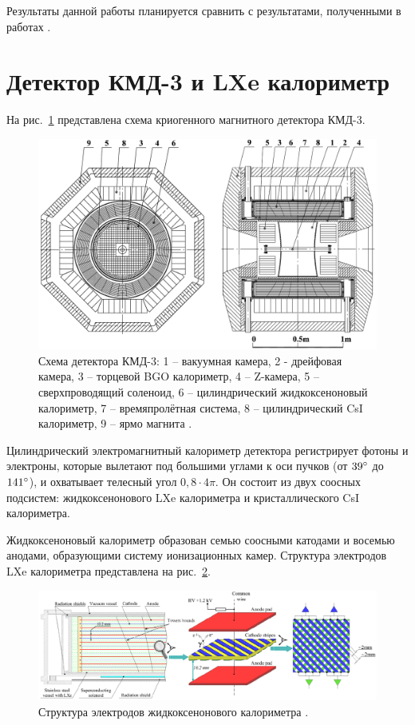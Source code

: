 \documentclass[14pt]{extarticle}
\begin{document}
Результаты данной работы планируется сравнить с результатами, полученными в работах \cite{lakomov,rabusov}.
\section{Детектор КМД-3 и LXe калориметр}
На рис.~\ref{fig:cmd3} представлена схема криогенного магнитного детектора КМД-3.
\begin{figure}[h!]
	\includegraphics[width=\linewidth]{../pics/cmd3-2.png}
	\caption{Схема детектора КМД-3: 1 -- вакуумная камера, 2 - дрейфовая камера, 3 -- торцевой BGO калориметр, 4 -- Z-камера, 5 -- сверхпроводящий соленоид, 6 -- цилиндрический жидкоксеноновый калориметр, 7 -- времяпролётная система, 8 -- цилиндрический CsI калориметр, 9 -- ярмо магнита \cite{shebalin}.}
	\label{fig:cmd3}
\end{figure}

Цилиндрический электромагнитный калориметр детектора регистрирует фотоны и электроны, которые вылетают под большими углами к оси пучков (от $39\degree$ до $141\degree$), и охватывает телесный угол $0,8 \cdot 4\pi$. Он состоит из двух соосных подсистем: жидкоксенонового LXe калориметра и кристаллического CsI калориметра.

Жидкоксеноновый калориметр образован семью соосными катодами и восемью анодами, образующими систему ионизационных камер. Структура электродов LXe калориметра представлена на рис.~\ref{fig:lxe-electrodes}.

\begin{figure}[h!]
	\includegraphics[width=\linewidth]{../pics/lxe-electrodes.png}
	\caption{Структура электродов жидкоксенонового калориметра \cite{shebalin}.}
	\label{fig:lxe-electrodes}
\end{figure}
\end{document}
